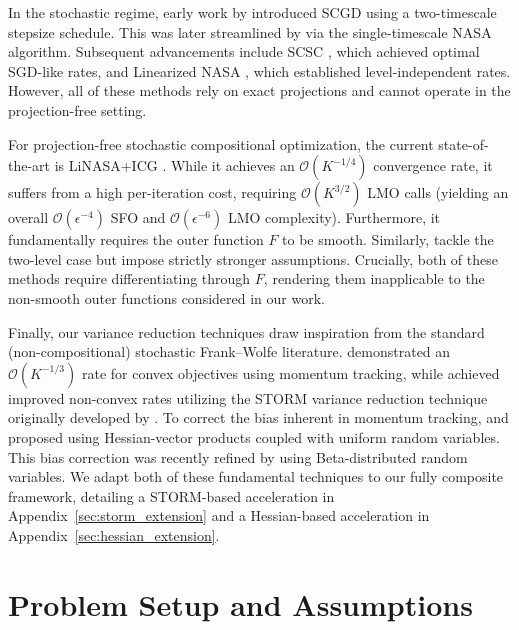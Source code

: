 \documentclass{article}
\begin{document}
In the stochastic regime, early work by \citet{wang2017stochastic} introduced SCGD using a two-timescale stepsize schedule. This was later streamlined by \citet{ghadimi2020single} via the single-timescale NASA algorithm. Subsequent advancements include SCSC \citep{chen2020solving}, which achieved optimal SGD-like rates, and Linearized NASA \citep{balasubramanian2022stochastic}, which established level-independent rates. However, all of these methods rely on exact projections and cannot operate in the projection-free setting.

For projection-free stochastic compositional optimization, the current state-of-the-art is LiNASA+ICG \citep{xiao2022projection}. While it achieves an $\mathcal{O}(K^{-1/4})$ convergence rate, it suffers from a high per-iteration cost, requiring $\mathcal{O}(K^{3/2})$ LMO calls (yielding an overall $\mathcal{O}(\epsilon^{-4})$ SFO and $\mathcal{O}(\epsilon^{-6})$ LMO complexity). Furthermore, it fundamentally requires the outer function $F$ to be smooth. Similarly, \citet{akhtar2021projection} tackle the two-level case but impose strictly stronger assumptions. Crucially, both of these methods require differentiating through $F$, rendering them inapplicable to the non-smooth outer functions considered in our work.

Finally, our variance reduction techniques draw inspiration from the standard (non-compositional) stochastic Frank--Wolfe literature. \citet{mokhtari2020stochastic} demonstrated an $\mathcal{O}(K^{-1/3})$ rate for convex objectives using momentum tracking, while \citet{yurtsever2019conditional} achieved improved non-convex rates utilizing the STORM variance reduction technique originally developed by \citet{cutkosky2019momentum}. To correct the bias inherent in momentum tracking, \citet{hassani2020stochastic} and \citet{zhang2019samplestochasticfrankwolfe} proposed using Hessian-vector products coupled with uniform random variables. This bias correction was recently refined by \citet{chayti2026ransomsecondordermomentumrandomized} using Beta-distributed random variables. We adapt both of these fundamental techniques to our fully composite framework, detailing a STORM-based acceleration in Appendix~\ref{sec:storm_extension} and a Hessian-based acceleration in Appendix~\ref{sec:hessian_extension}.

\section{Problem Setup and Assumptions}
\end{document}
